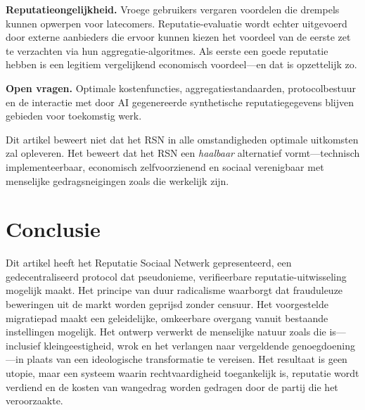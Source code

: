 \documentclass[11pt,a4paper,twocolumn]{article}
\begin{document}
\textbf{Reputatieongelijkheid.} Vroege gebruikers vergaren voordelen die drempels kunnen opwerpen voor latecomers. Reputatie-evaluatie wordt echter uitgevoerd door externe aanbieders die ervoor kunnen kiezen het voordeel van de eerste zet te verzachten via hun aggregatie-algoritmes. Als eerste een goede reputatie hebben is een legitiem vergelijkend economisch voordeel---en dat is opzettelijk zo.

\textbf{Open vragen.} Optimale kostenfuncties, aggregatiestandaarden, protocolbestuur en de interactie met door AI gegenereerde synthetische reputatiegegevens blijven gebieden voor toekomstig werk.

Dit artikel beweert niet dat het RSN in alle omstandigheden optimale uitkomsten zal opleveren. Het beweert dat het RSN een \emph{haalbaar} alternatief vormt---technisch implementeerbaar, economisch zelfvoorzienend en sociaal verenigbaar met menselijke gedragsneigingen zoals die werkelijk zijn.

\section{Conclusie}

Dit artikel heeft het Reputatie Sociaal Netwerk gepresenteerd, een gedecentraliseerd protocol dat pseudonieme, verifieerbare reputatie-uitwisseling mogelijk maakt. Het principe van duur radicalisme waarborgt dat frauduleuze beweringen uit de markt worden geprijsd zonder censuur. Het voorgestelde migratiepad maakt een geleidelijke, omkeerbare overgang vanuit bestaande instellingen mogelijk. Het ontwerp verwerkt de menselijke natuur zoals die is---inclusief kleingeestigheid, wrok en het verlangen naar vergeldende genoegdoening---in plaats van een ideologische transformatie te vereisen. Het resultaat is geen utopie, maar een systeem waarin rechtvaardigheid toegankelijk is, reputatie wordt verdiend en de kosten van wangedrag worden gedragen door de partij die het veroorzaakte.


\end{document}
